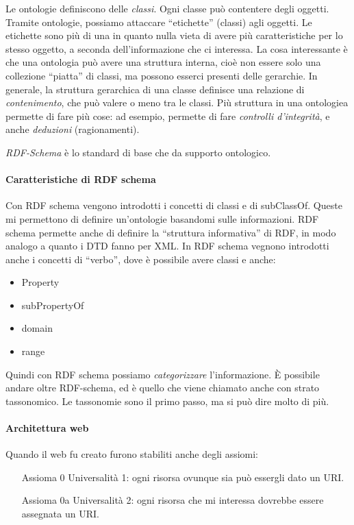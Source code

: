 Le ontologie definiscono delle \textit{classi}. Ogni classe pu\`o contentere degli oggetti. Tramite ontologie, possiamo attaccare ``etichette'' (classi) agli oggetti. Le etichette sono pi\`u di una in quanto nulla vieta di avere pi\`u caratteristiche per lo stesso oggetto, a seconda dell'informazione che ci interessa. La cosa interessante \`e che una ontologia pu\`o avere una struttura interna, cio\`e non essere solo una collezione ``piatta'' di classi, ma possono esserci presenti delle gerarchie. In generale, la struttura gerarchica di una classe definisce una relazione di \textit{contenimento}, che pu\`o valere o meno tra le classi. Pi\`u struttura in una ontologiea permette di fare pi\`u cose: ad esempio, permette di fare \textit{controlli d'integrit\`a}, e anche \textit{deduzioni} (ragionamenti).

\textit{RDF-Schema} \`e lo standard di base che da supporto ontologico.

\paragraph*{Caratteristiche di RDF schema}Con RDF schema vengono introdotti i concetti di classi e di subClassOf. Queste mi permettono di definire un'ontologie basandomi sulle informazioni. RDF schema permette anche di definire la ``struttura informativa'' di RDF, in modo analogo a quanto i DTD fanno per XML. In RDF schema vegnono introdotti anche i concetti di ``verbo'', dove \`e possibile avere classi e anche:
\begin{itemize}

\item Property %
\item subPropertyOf
\item domain
\item range

\end{itemize}

Quindi con RDF schema possiamo \textit{categorizzare} l'informazione. \`E possibile andare oltre RDF-schema, ed \`e quello che viene chiamato anche con strato tassonomico. Le tassonomie sono il primo passo, ma si pu\`o dire molto di pi\`u.

\paragraph*{Architettura web}Quando il web fu creato furono stabiliti anche degli assiomi:
\begin{itemize}

\item[Assioma 0] Universalit\`a 1: ogni risorsa ovunque sia pu\`o essergli dato un URI.
\item[Assioma 0a] Universalit\`a 2: ogni risorsa che mi interessa dovrebbe essere assegnata un URI.
  

\end{itemize}

